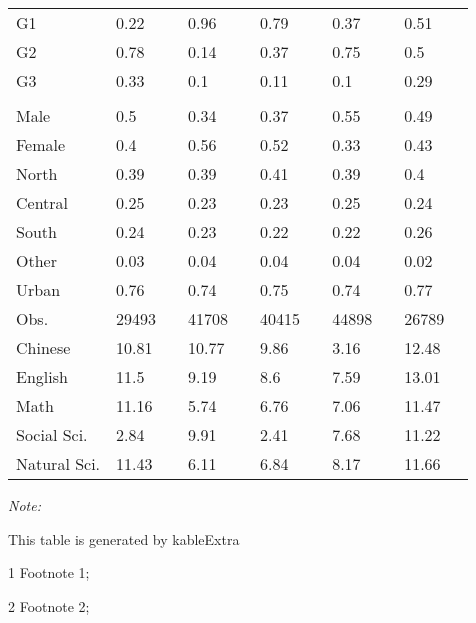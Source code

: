 \begin{table}
\begin{threeparttable}
\begin{tabular}[t]{lllllllllll}
\hspace{1em}G1 & 0.22 &  & 0.96 &  & 0.79 &  & 0.37 &  & 0.51 & \\
\hspace{1em}G2 & 0.78 &  & 0.14 &  & 0.37 &  & 0.75 &  & 0.5 & \\
\hspace{1em}G3 & 0.33 &  & 0.1 &  & 0.11 &  & 0.1 &  & 0.29 & \\
\addlinespace[0.3em]
\multicolumn{11}{l}{\textit{\textbf{Panel D: Demographic}}}\\
\hspace{1em}Male & 0.5 &  & 0.34 &  & 0.37 &  & 0.55 &  & 0.49 & \\
\hspace{1em}Female & 0.4 &  & 0.56 &  & 0.52 &  & 0.33 &  & 0.43 & \\
\hspace{1em}North & 0.39 &  & 0.39 &  & 0.41 &  & 0.39 &  & 0.4 & \\
\hspace{1em}Central & 0.25 &  & 0.23 &  & 0.23 &  & 0.25 &  & 0.24 & \\
\hspace{1em}South & 0.24 &  & 0.23 &  & 0.22 &  & 0.22 &  & 0.26 & \\
\hspace{1em}Other & 0.03 &  & 0.04 &  & 0.04 &  & 0.04 &  & 0.02 & \\
\hspace{1em}Urban & 0.76 &  & 0.74 &  & 0.75 &  & 0.74 &  & 0.77 & \\
Obs. & 29493 &  & 41708 &  & 40415 &  & 44898 &  & 26789 & \\
Chinese & 10.81 &  & 10.77 &  & 9.86 &  & 3.16 &  & 12.48 & \\
English & 11.5 &  & 9.19 &  & 8.6 &  & 7.59 &  & 13.01 & \\
Math & 11.16 &  & 5.74 &  & 6.76 &  & 7.06 &  & 11.47 & \\
Social Sci. & 2.84 &  & 9.91 &  & 2.41 &  & 7.68 &  & 11.22 & \\
Natural Sci. & 11.43 &  & 6.11 &  & 6.84 &  & 8.17 &  & 11.66 & \\
\bottomrule
\end{tabular}
\begin{tablenotes}
\item \textit{Note: } 
\item This table is generated by kableExtra
\item[1] Footnote 1; 
\item[2] Footnote 2; 
\end{tablenotes}
\end{threeparttable}
\end{table}
